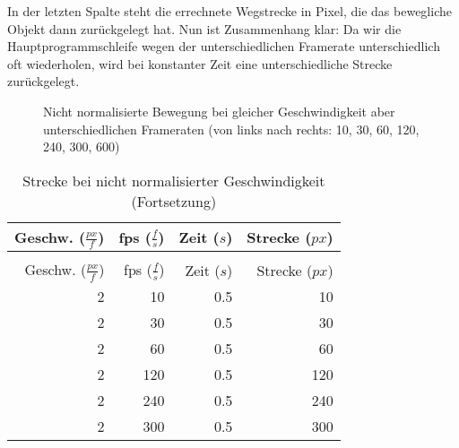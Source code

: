 In der letzten Spalte steht die errechnete Wegstrecke in Pixel, die das bewegliche Objekt dann zurückgelegt hat. Nun ist Zusammenhang klar: Da wir die Hauptprogrammschleife wegen der unterschiedlichen Framerate unterschiedlich oft wiederholen, wird bei konstanter Zeit eine unterschiedliche Strecke zurückgelegt.

\begin{figure}[hbtp] 
\begin{center}
	\caption[Nicht normalisierte Bewegung]{Nicht normalisierte Bewegung bei gleicher Geschwindigkeit aber unterschiedlichen Frameraten (von links nach rechts: 10, 30, 60, 120, 240, 300, 600)}\label{fpsbewegung00}
\end{center}
\end{figure}

\begin{longtable}{r@{ * }r@{ * }r@{ = }r}
	\caption{Strecke bei nicht normalisierter Geschwindigkeit}\label{tabFpsBewegung01} \\[1em]
    Geschw. ($\frac{px}{f}$) & fps ($\frac{f}{s}$) & Zeit ($s$)& Strecke ($px$) \\[0.5em]\hline\hline
	\hline
	\endfirsthead %
	\caption{Strecke bei nicht normalisierter Geschwindigkeit (Fortsetzung)}\\[1em]
	Geschw. ($\frac{px}{f}$) & fps ($\frac{f}{s}$) & Zeit ($s$)& Strecke ($px$)\\[0.5em]\hline\hline
	\hline
	\endhead %
	2  &   10 & 0.5 &  10 \\ \hline
	2  &   30 & 0.5 &  30 \\ \hline
	2  &   60 & 0.5 &  60 \\ \hline
	2  &  120 & 0.5 & 120 \\ \hline
	2  &  240 & 0.5 & 240 \\ \hline
	2  &  300 & 0.5 & 300 \\ \hline
\end{longtable} 

